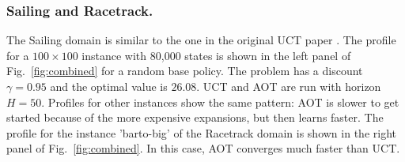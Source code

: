 \documentclass[letterpaper]{article}
\newcommand{\Omit}[1]{}
\begin{document}
\subsubsection{Sailing and Racetrack.} The Sailing domain is  similar to the one %
in the original  UCT paper \cite{uct}. The profile for a $100\times 100$ instance with
80,000 states  is shown in the left panel of Fig.~\ref{fig:combined} for a random base
policy.
The problem has a discount $\gamma=0.95$ and the optimal value is $26.08$.
UCT and AOT are run with horizon $H=50$.
Profiles for other instances show the same pattern: AOT is slower
to get started because of the more expensive expansions, but then learns
faster.
The profile for the instance 'barto-big' of the Racetrack domain
\cite{barto:rtdp} is shown in the right panel of Fig.~\ref{fig:combined}.
In this case, AOT converges %
much faster than UCT.

\Omit{
.  The results are shown  in Fig.~\ref{fig:race:tradeoff}
for one of the standard instances. UCT was run for 10, 50, 100, 500, 1k, 5k, 10k iterations,
while AOT for 10, 50, 100, 500, 1k iterations.
The problem is undiscounted and $H$ is $50$. The same
base policies have been used. The problem has optimal value
of $26.13430$ and the  number of states is 22,534 states.}

\Omit{
and found that while the $\Delta$
It
based on the computation of the $\Delta$'s, and
the use of base policies vs.\ heuristic values for
setting the values of tips in AOT.
In principle, $\Delta$-based selection
of tip nodes payoffs a lot in comparison with random tip
selection, when a base random policy is used, and less when informed
base policies are used instead  (Fig.~\ref{fig:ctp:selection:10-7}).
}
\end{document}
